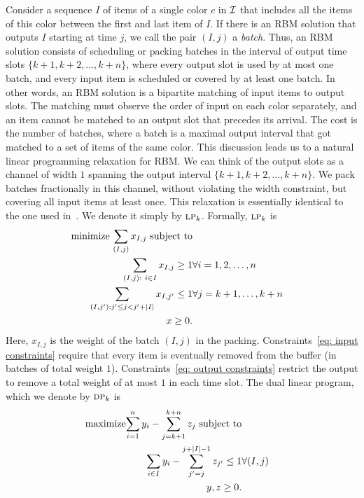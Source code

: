 \documentclass[12pt]{article}
\newcommand{\LP}{{\hbox{\sc lp}}}
\newcommand{\DP}{{\hbox{\sc dp}}}
\begin{document}
Consider a sequence $I$ of items of a single color $c$ in 
${\cal I}$ that includes all the items of this color between
the first and last item of $I$. If there is an RBM solution
that outputs $I$ starting at time $j$, we call the pair $(I,j)$
a {\em batch}. Thus, an RBM solution consists of scheduling
or packing batches in the interval of output time slots
$\{k+1,k+2,\dots,k+n\}$, where every output slot is used by at most
one batch, and every input item is scheduled or covered
by at least one batch. In other words, an RBM solution
is a bipartite matching of input items to output slots. The
matching must observe the order of input on each color
separately, and an item cannot be matched to an output
slot that precedes its arrival. The cost is the number of batches, where
a batch is a maximal output interval that got matched to
a set of items of the same color. This discussion leads us
to a natural linear programming relaxation for RBM. We
can think of the output slots as a channel of width $1$
spanning the output interval $\{k+1,k+2,\dots,k+n\}$.
We pack batches fractionally in this channel, without
violating the width constraint, but covering all input items 
at least once. This relaxation is essentially identical to the
one used in~\cite{AR10,AR13}. We denote it simply by
$\LP_k$. Formally, $\LP_k$ is
\begin{eqnarray}
\nonumber
\hbox{minimize\ } \displaystyle{\sum_{(I,j)} x_{I,j}} \hbox{   subject to} & &\\
\label{eq: input constraints}
\displaystyle{\sum_{(I,j):\ i\in I}x_{I,j} \ge 1} & \forall i=1,2,\ldots,n & \\
\label{eq: output constraints}
\displaystyle{\sum_{(I,j'): j'\le j <j'+|I|}x_{I,j'} \le 1} & \forall j=k+1,\ldots , k+n & \\
\nonumber
x\ge 0. & &
\end{eqnarray}
Here, $x_{I,j}$ is the weight of the batch $(I,j)$ in the packing.
Constraints~\eqref{eq: input constraints} require that every item
is eventually removed from the buffer (in batches of total weight
$1$). Constraints~\eqref{eq: output constraints} restrict the output
to remove a total weight of at most $1$ in each time slot.
The dual linear program, which we denote by $\DP_k$ is
\begin{eqnarray}
\nonumber
\hbox{maximize} \displaystyle{\sum_{i=1}^{n} y_i - \sum_{j=k+1}^{k+n}z_j} \hbox{   subject to} & & \\
\label{eq: dual constraints}
\displaystyle{\sum_{i\in I}y_{i}-\sum_{j'=j}^{j+|I|-1}z_{j'} \le 1} & \forall (I,j) & \\
\nonumber
y,z\ge 0. & &
\end{eqnarray}
\end{document}
